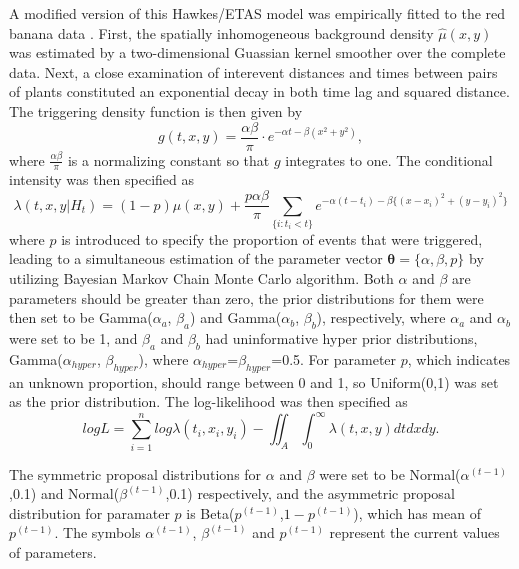 \documentclass[11pt]{article}\usepackage[]{graphicx}\usepackage[]{color}
\begin{document}
{A modified version of this Hawkes/ETAS model was empirically fitted to the red banana data \citep{Balderama12}. First, the spatially inhomogeneous background density $\hat\mu(x,y)$ was estimated by a two-dimensional Guassian kernel smoother over the complete data. Next, a close examination of interevent distances and times between pairs of plants constituted an exponential decay in both time lag and squared distance. The triggering density function is then given by
\begin{equation}\label{gredbanana}
g(t,x,y) = \dfrac{\alpha \beta}{\pi} \cdot e^{-\alpha t - \beta(x^2+y^2)},
\end{equation}
where $\frac{\alpha\beta}{\pi}$ is a normalizing constant so that $g$ integrates to one. The conditional intensity was then specified as 
\begin{equation}\label{etasplants}
\lambda(t,x,y | H_t) = (1-p)\mu(x,y) + \dfrac{p \alpha \beta}{\pi} \sum_{\{i:t_i < t\}} e^{-\alpha (t-t_i) - \beta\{(x-x_i)^2+(y-y_i)^2\}}
\end{equation}
where $p$ is introduced to specify the proportion of events that were triggered, leading to a simultaneous estimation of the parameter vector $\boldsymbol{\theta} = \{\alpha, \beta, p\}$ by utilizing Bayesian Markov Chain Monte Carlo algorithm. Both $\alpha$ and $\beta$ are parameters should be greater than zero, the prior distributions for them were then set to be Gamma($\alpha_a$, $\beta_a$) and Gamma($\alpha_b$, $\beta_b$), respectively, where $\alpha_a$ and $\alpha_b$ were set to be 1, and $\beta_a$ and $\beta_b$ had uninformative hyper prior distributions, Gamma($\alpha_{hyper}$, $\beta_{hyper}$), where $\alpha_{hyper}$=$\beta_{hyper}$=0.5. For parameter $p$, which indicates an unknown proportion, should range between 0 and 1, so Uniform(0,1) was set as the prior distribution. The log-likelihood was then specified as
\begin{equation}
logL = \sum_{i=1}^{n} log\lambda(t_i,x_i,y_i) - \iint_A \int_{0}^{\infty}\lambda(t,x,y)dtdxdy.
\end{equation}

The symmetric proposal distributions for $\alpha$ and $\beta$ were set to be Normal($\alpha^{(t-1)}$,0.1) and Normal($\beta^{(t-1)}$,0.1) respectively, and the asymmetric proposal distribution for paramater $p$ is Beta($p^{(t-1)}$,$1-p^{(t-1)}$), which has mean of $p^{(t-1)}$. The symbols $\alpha^{(t-1)}$, $\beta^{(t-1)}$ and $p^{(t-1)}$ represent the current values of parameters. 

}
\end{document}
